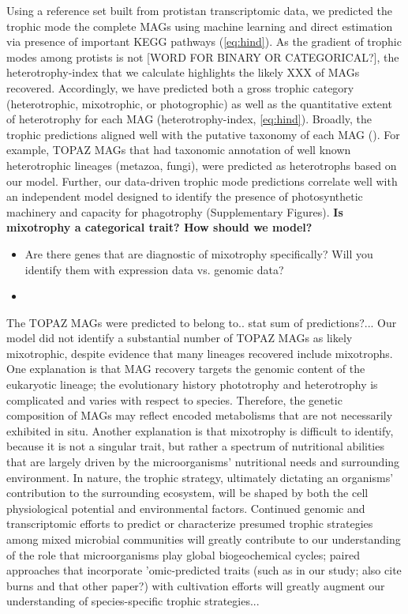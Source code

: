 \documentclass[12pt]{article}
\numberwithin{equation}{section}
\begin{document}

Using a reference set built from protistan transcriptomic data, we predicted the trophic mode the complete MAGs using machine learning and direct estimation via presence of important KEGG pathways (\cref{eq:hind}). As the gradient of trophic modes among protists is not [WORD FOR BINARY OR CATEGORICAL?], the heterotrophy-index that we calculate highlights the likely XXX of MAGs recovered. Accordingly, we have predicted both a gross trophic category (heterotrophic, mixotrophic, or photogrophic) as well as the quantitative extent of heterotrophy for each MAG (heterotrophy-index, \cref{eq:hind}). Broadly, the trophic predictions aligned well with the putative taxonomy of each MAG (). For example, TOPAZ MAGs that had taxonomic annotation of well known heterotrophic lineages (metazoa, fungi),  were predicted as heterotrophs based on our model.  Further, our data-driven trophic mode predictions correlate well with an independent model designed to identify the presence of photosynthetic machinery and capacity for phagotrophy \citep{burns2018gene} (Supplementary Figures). %
\textbf{Is mixotrophy a categorical trait? How should we model?}
\begin{itemize}
    \item Are there genes that are diagnostic of mixotrophy specifically? Will you identify them with expression data vs. genomic data? 
    \item 
\end{itemize}

The TOPAZ MAGs were predicted to belong to.. stat sum of predictions?... Our model did not identify a substantial number of TOPAZ MAGs as likely mixotrophic, despite evidence that many lineages recovered include mixotrophs. One explanation is that MAG recovery targets the genomic content of the eukaryotic lineage; the evolutionary history phototrophy and heterotrophy is complicated and varies with respect to species. Therefore, the genetic composition of MAGs may reflect encoded metabolisms that are not necessarily exhibited in situ. Another explanation is that mixotrophy is difficult to identify, because it is not a singular trait, but rather a spectrum of nutritional abilities that are largely driven by the microorganisms' nutritional needs and surrounding environment. 
In nature, the trophic strategy, ultimately dictating an organisms' contribution to the surrounding ecosystem, will be shaped by both the cell physiological potential and environmental factors. Continued genomic and transcriptomic efforts to predict or characterize presumed trophic strategies among mixed microbial communities will greatly contribute to our understanding of the role that microorganisms play global biogeochemical cycles; paired approaches that incorporate 'omic-predicted traits (such as in our study; also cite burns and that other paper?) with cultivation efforts will greatly augment our understanding of species-specific trophic strategies... 
\end{document}
